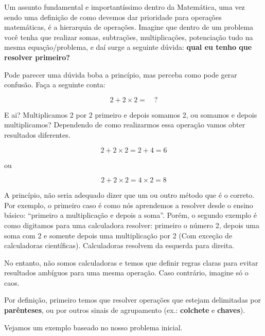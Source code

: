 Um assunto fundamental e importantíssimo dentro da Matemática, uma vez sendo uma definição de como devemos dar prioridade para operações matemáticas, é a hierarquia de operações. Imagine que dentro de um problema você tenha que realizar somas, subtrações, multiplicações, potenciação tudo na mesma equação/problema, e daí surge a seguinte dúvida: \textbf{qual eu tenho que resolver primeiro?}

Pode parecer uma dúvida boba a princípio, mas perceba como pode gerar confusão. Faça a seguinte conta:

\begin{equation}
    2 + 2\times2= \quad?
\end{equation}

E ai? Multiplicamos 2 por 2 primeiro e depois somamos 2, ou somamos e depois multiplicamos? Dependendo de como realizarmos essa operação vamos obter resultados diferentes.

\begin{equation}
    2 + 2\times2 = 2 + 4 = 6
\end{equation}

ou

\begin{equation}
    2 + 2\times2 = 4\times2 = 8
\end{equation}

A princípio, não seria adequado dizer que um ou outro método que é o correto. Por exemplo, o primeiro caso é como nós aprendemos a resolver desde o ensino básico: ``primeiro a multiplicação e depois a soma''. Porém, o segundo exemplo é como digitamos para uma calculadora resolver: primeiro o número 2, depois uma soma com 2 e somente depois uma multiplicação por 2 (Com exceção de calculadoras científicas). Calculadoras resolvem da esquerda para direita.

No entanto, não somos calculadoras e temos que definir regras claras para evitar resultados ambíguos para uma mesma operação. Caso contrário, imagine só o caos.

\begin{tcolorbox}[title = Parenteses\, Colchetes e Chaves]
    Por definição, primeiro temos que resolver operações que estejam delimitadas por \textbf{parênteses}, ou por outros sinais de agrupamento (ex.: \textbf{colchete} e \textbf{chaves}).
\end{tcolorbox}

Vejamos um exemplo baseado no nosso problema inicial.

